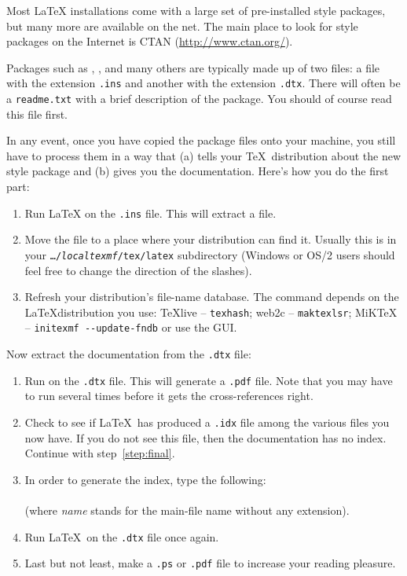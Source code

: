 Most \LaTeX{} installations come with a large set of pre-installed
style packages, but many more are available on the net. The main
place to look for style packages on the Internet is CTAN (\url{http://www.ctan.org/}).

Packages such as , , and many
others are typically made up of two files: a file with the extension
\texttt{.ins} and another with the extension \texttt{.dtx}. There
will often be a \texttt{readme.txt} with a brief description of the
package. You should of course read this file first.

In any event, once you have copied the package files onto your
machine, you still have to process them in a way that (a) tells your
\TeX\ distribution about the new style package and (b) gives you
the documentation.  Here's how you do the first part:

\begin{enumerate}
\item Run \LaTeX{} on the \texttt{.ins} file. This will
  extract a  file.
\item Move the  file to a place where your distribution
  can find it. Usually this is in your \texttt{\ldots/\emph{localtexmf}/tex/latex}
  subdirectory (Windows or OS/2 users should feel free to change the
  direction of the slashes).
\item Refresh your distribution's file-name database. The command
  depends on the \LaTeX distribution you use:
  \TeX{}live -- \texttt{texhash}; web2c -- \texttt{maktexlsr};
  MiK\TeX{} -- \texttt{initexmf -{}-update-fndb} or use the GUI.
\end{enumerate}

\noindent Now extract the documentation from the
\texttt{.dtx} file:

\begin{enumerate}
\item Run  on the \texttt{.dtx} file.  This will generate a
  \texttt{.pdf} file. Note that you may have to run 
  several times before it gets the cross-references right.
\item Check to see if \LaTeX\ has produced a \texttt{.idx} file
  among the various files you now have.
  If you do not see this file, then the documentation has no index. Continue
  with step~\ref{step:final}.
\item In order to generate the index, type the following:\\
        \\
        (where \textit{name} stands for the main-file name without any
    extension).
 \item Run \LaTeX\ on the \texttt{.dtx} file once again. \label{step:next}

\item Last but not least, make a \texttt{.ps} or \texttt{.pdf}
  file to increase your reading pleasure.\label{step:final}

\end{enumerate}

